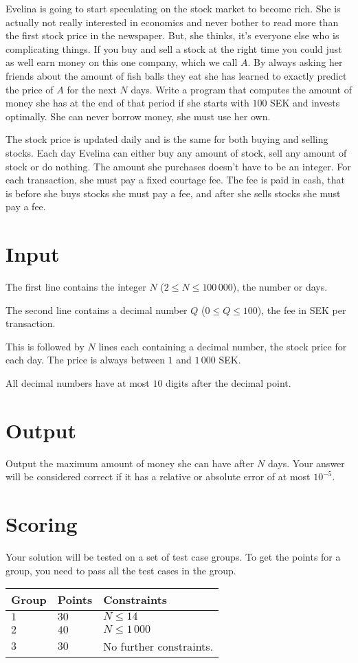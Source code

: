 Evelina is going to start speculating on the stock market to become rich.
She is actually not really interested in economics and never bother to read more than the first stock price in the newspaper.
But, she thinks, it's everyone else who is complicating things.
If you buy and sell a stock at the right time you could just as well earn money on this one company, which we call $A$.
By always asking her friends about the amount of fish balls they eat she has learned to exactly predict the price of $A$ for the next $N$ days.
Write a program that computes the amount of money she has at the end of that period if she starts with $100$ SEK and invests optimally.
She can never borrow money, she must use her own.

The stock price is updated daily and is the same for both buying and selling stocks.
Each day Evelina can either buy any amount of stock, sell any amount of stock or do nothing.
The amount she purchases doesn't have to be an integer.
For each transaction, she must pay a fixed courtage fee.
The fee is paid in cash, that is before she buys stocks she must pay a fee, and after she sells stocks she must pay a fee.

\section*{Input}
The first line contains the integer $N$ ($2 \le N \le 100\,000$), the number or days.

The second line contains a decimal number $Q$ ($0 \le Q \le 100$), the fee in SEK per transaction.

This is followed by $N$ lines each containing a decimal number, the stock price for each day.
The price is always between $1$ and $1\,000$ SEK.

All decimal numbers have at most $10$ digits after the decimal point.

\section*{Output}
Output the maximum amount of money she can have after $N$ days.
Your answer will be considered correct if it has a relative or absolute error of at most $10^{-5}$.

\section*{Scoring}
Your solution will be tested on a set of test case groups.
To get the points for a group, you need to pass all the test cases in the group.

\noindent
\begin{tabular}{| l | l | p{10cm} |}
\hline
Group & Points & Constraints \\ \hline
  $1$    & $30$        & $N \le 14$ \\ \hline 
  $2$    & $40$        & $N \le 1\,000$ \\ \hline
  $3$    & $30$        & No further constraints. \\ \hline 
\end{tabular}

